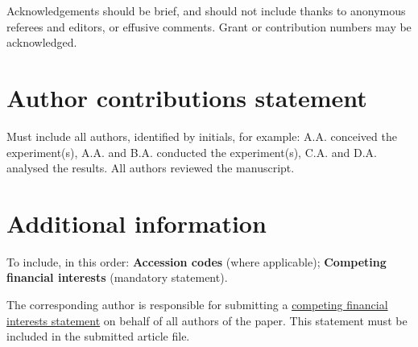 \documentclass[fleqn,10pt]{wlscirep}
\begin{document}
Acknowledgements should be brief, and should not include thanks to anonymous referees and editors, or effusive comments. Grant or contribution numbers may be acknowledged.

\section*{Author contributions statement}

Must include all authors, identified by initials, for example:
A.A. conceived the experiment(s),  A.A. and B.A. conducted the experiment(s), C.A. and D.A. analysed the results.  All authors reviewed the manuscript.

\section*{Additional information}

To include, in this order: \textbf{Accession codes} (where applicable); \textbf{Competing financial interests} (mandatory statement).

The corresponding author is responsible for submitting a \href{http://www.nature.com/srep/policies/index.html#competing}{competing financial interests statement} on behalf of all authors of the paper. This statement must be included in the submitted article file.
\end{document}
